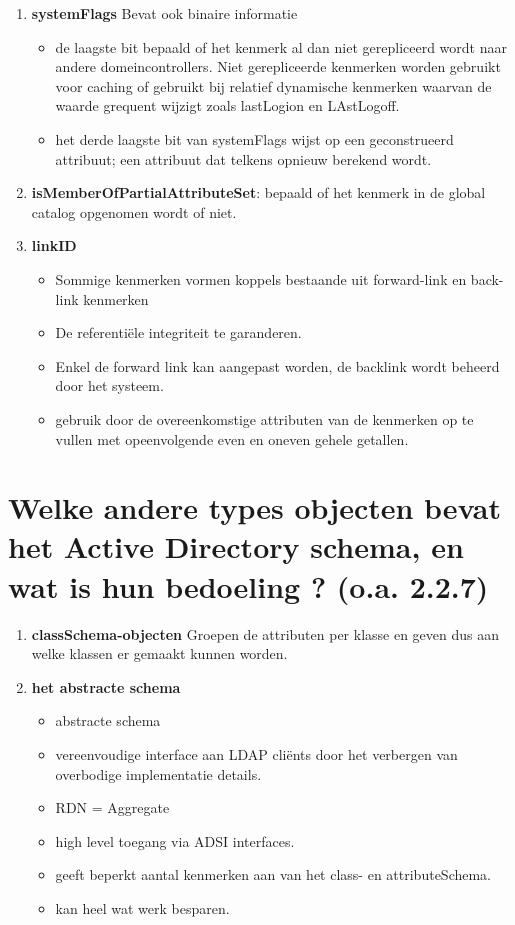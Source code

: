 \begin{enumerate}
\item \textbf{systemFlags} Bevat ook binaire informatie
\begin{itemize}
\item de laagste bit bepaald of het kenmerk al dan niet gerepliceerd wordt naar andere domeincontrollers. Niet gerepliceerde kenmerken worden gebruikt voor caching of gebruikt bij relatief dynamische kenmerken waarvan de waarde grequent wijzigt zoals lastLogion en LAstLogoff.
\item het derde laagste bit van systemFlags wijst op een geconstrueerd attribuut; een attribuut dat telkens opnieuw berekend wordt.
\end{itemize}

\item \textbf{isMemberOfPartialAttributeSet}: bepaald of het kenmerk in de global catalog opgenomen wordt of niet.

\item \textbf{linkID}
\begin{itemize}
\item Sommige kenmerken vormen koppels bestaande uit forward-link en back-link kenmerken
\item De referenti\"ele integriteit te garanderen.
\item Enkel de forward link kan aangepast worden, de backlink wordt beheerd door het systeem.
\item gebruik door de overeenkomstige attributen van de kenmerken op te vullen met opeenvolgende even en oneven gehele getallen.
\end{itemize}
\end{enumerate}

\section{Welke andere types objecten bevat het Active Directory schema, en wat is hun bedoeling ? (o.a. 2.2.7)}

\begin{enumerate}
\item \textbf{classSchema-objecten} Groepen de attributen per klasse en geven dus aan welke klassen er gemaakt kunnen worden.
\item \textbf{het abstracte schema}
\begin{itemize}
\item abstracte schema
\item vereenvoudige interface aan LDAP cli\"ents door het verbergen van overbodige implementatie details.
\item RDN = Aggregate
\item high level toegang via ADSI interfaces.
\item geeft beperkt aantal kenmerken aan van het class- en attributeSchema.
\item kan heel wat werk besparen.
\end{itemize}
\end{enumerate}

